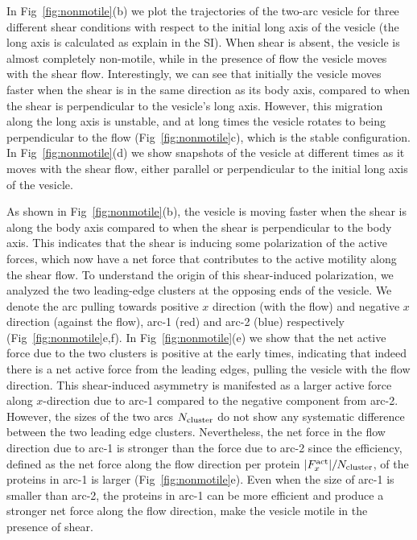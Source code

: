 \documentclass[
reprint,
superscriptaddress,
 amsmath,amssymb,
 aps,
prl,
floatfix]{revtex4-2}
\begin{document}
In Fig~\ref{fig:nonmotile}(b) we plot the trajectories of the two-arc vesicle for three different shear conditions with respect to the initial long axis of the vesicle (the long axis is calculated as explain in the SI). When shear is absent, the vesicle is almost completely non-motile, while in the presence of flow the vesicle moves with the shear flow. Interestingly, we can see that initially the vesicle moves faster when the shear is in the same direction as its body axis, compared to when the shear is perpendicular to the vesicle's long axis. However, this migration along the long axis is unstable, and at long times the vesicle rotates to being perpendicular to the flow (Fig~\ref{fig:nonmotile}c), which is the stable configuration. In Fig~\ref{fig:nonmotile}(d) we show snapshots of the vesicle at different times as it moves with the shear flow, either parallel or perpendicular to the initial long axis of the vesicle. 

As shown in Fig~\ref{fig:nonmotile}(b), the vesicle is moving faster when the shear is along the body axis compared to when the shear is perpendicular to the body axis. This indicates that the shear is inducing some polarization of the active forces, which now have a net force that contributes to the active motility along the shear flow. To understand the origin of this shear-induced polarization, we analyzed the two leading-edge clusters at the opposing ends of the vesicle. We denote the arc pulling towards positive $x$ direction (with the flow) and negative $x$ direction (against the flow), arc-1 (red) and arc-2 (blue) respectively (Fig~\ref{fig:nonmotile}e,f). In Fig~\ref{fig:nonmotile}(e) we show that the net active force due to the two clusters  is positive at the early times, indicating that indeed there is a net active force from the leading edges, pulling the vesicle with the flow direction. This shear-induced asymmetry is manifested as a larger active force along $x$-direction due to arc-1 compared to the negative component from arc-2.
However, the sizes of the two arcs $N_{\rm cluster}$ do not show any systematic difference between the two leading edge clusters. Nevertheless, the net force in the flow direction due to arc-1 is stronger than the force due to arc-2 since the efficiency, defined as the net force along the flow direction per protein $|F^{\rm act}_x|/N_{\rm cluster}$, of the proteins in arc-1 is larger (Fig~\ref{fig:nonmotile}e). 
Even when the size of arc-1 is smaller than arc-2, the proteins in arc-1 can be more efficient and produce a stronger net force along the flow direction, make the vesicle motile in the presence of shear.
\end{document}
